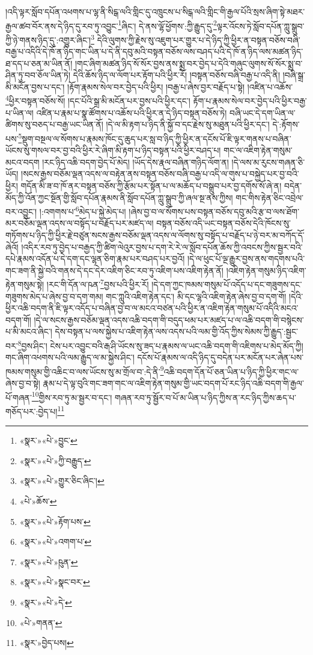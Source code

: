 །འདི་ལྟར་སློབ་དཔོན་འཕགས་པ་ལྷ་ནི་སིངྒ་ལའི་གླིང་དུ་འཁྲུངས་པ་སིངྒ་ལའི་གླིང་གི་རྒྱལ་པོའི་སྲས་ཞིག་སྟེ་མཐར་རྒྱལ་ཚབ་བོར་ནས་དེ་ཉིད་དུ་རབ་ཏུ་འབྱུང་\footnote{«སྣར་»«པེ་»བྱུང་}ཞིང་། དེ་ནས་ལྷོ་ཕྱོགས་:ཀྱི་རྒྱུད་དུ་\footnote{«སྣར་»«པེ་»ཀྱི་བརྒྱུད་}ལྟར་འོངས་ཏེ་སློབ་དཔོན་ཀླུ་སྒྲུབ་ཀྱི་ཉེ་གནས་ཉིད་དུ་:འགྱུར་ཞིང་།\footnote{«སྣར་»«པེ་»གྱུར་ཅིང་ཞིང་།} དེའི་ལུགས་ཀྱི་རྗེས་སུ་འཇུག་པར་གྱུར་པ་དེ་ཉིད་ཀྱི་ཕྱིར་ན་བསྟན་བཅོས་བཞི་བརྒྱ་པ་འདིའི་དེ་ཁོ་ན་ཉིད་གང་ཡིན་པ་དེ་ནི་དབུ་མའི་བསྟན་བཅོས་ལས་བཤད་པའི་དེ་ཁོ་ན་ཉིད་ལས་མཚན་ཉིད་ཐ་དད་པ་ཅན་མ་ཡིན་ནོ། །གང་ཞིག་མཚན་ཉིད་སོ་སོར་བྱས་ནས་སྨྲ་བར་བྱེད་པ་དེའི་གཞུང་ལུགས་སོ་སོར་སྨྲ་བ་ཤིན་ཏུ་བབ་ཅོལ་ཡིན་ཏེ། དེའི་ཆོས་ཉིད་ལ་ལོག་པར་རྟོག་པའི་ཕྱིར་རོ། །བསྟན་བཅོས་བཞི་བརྒྱ་པ་འདི་ནི། །བཞི་སྒྲ་མི་མངོན་བྱས་པ་དང་། །རྟོག་རྣམས་སེལ་བར་བྱེད་པའི་ཕྱིར། །བརྒྱ་པ་ཞེས་བྱར་བརྗོད་པ་སྟེ། །འཛིན་པ་འཆོས་\footnote{«པེ་»ཆོས་}ཕྱིར་བསྟན་བཅོས་སོ། །དང་པོའི་སྒྲ་མི་མངོན་པར་བྱས་པའི་ཕྱིར་དང་། རྟོག་པ་རྣམས་སེལ་བར་བྱེད་པའི་ཕྱིར་བརྒྱ་པ་ཡིན་ལ། འཛིན་པ་རྣམ་པ་སྣ་ཚོགས་པ་འཆོས་པའི་ཕྱིར་ན་དེ་ཉིད་བསྟན་བཅོས་ཏེ། བཞི་ཡང་དེ་དག་ཡིན་ལ་ཚིགས་སུ་བཅད་པ་བརྒྱ་ཡང་ཡིན་ནོ། །དེ་ལ་མི་རྟག་པ་ཉིད་ནི་སྐྱོ་བ་དང་རྗེས་སུ་མཐུན་པའི་ཕྱིར་དང་། དེ་:རྟོགས་པས་\footnote{«སྣར་»«པེ་»རྟོག་པས་}སྡུག་བསྔལ་ལ་སོགས་པ་རྣམས་ཁོང་དུ་ཆུད་པར་སླ་བ་ཉིད་ཀྱི་ཕྱིར་ན་དངོས་པོ་ཇི་ལྟར་གནས་པ་བཞིན་ཡོངས་སུ་གསལ་བར་བྱ་བའི་ཕྱིར་རེ་ཞིག་མི་རྟག་པ་ཉིད་བསྟན་པའི་ཕྱིར་བཤད་པ། གང་ལ་འཇིག་རྟེན་གསུམ་མངའ་བདག །རང་ཉིད་འཆི་བདག་བྱེད་པོ་མེད། །ཡོད་དེས་རྣལ་བཞིན་གཉིད་ལོག་ན། །དེ་ལས་མ་རུངས་གཞན་ཅི་ཡོད། །སངས་རྒྱས་བཅོམ་ལྡན་འདས་ལ་བརྟེན་ནས་བསྟན་བཅོས་བཞི་བརྒྱ་པ་འདི་ལ་གུས་པ་བསྐྱེད་པར་བྱ་བའི་ཕྱིར། གདོན་མི་ཟ་བ་ཁོ་ནར་བསྟན་བཅོས་ཀྱི་རྩོམ་པར་སྟོན་པ་ལ་མཆོད་པ་བསྒྲུབ་པར་བྱ་དགོས་སོ་ཞེ་ན། བདེན་མོད་ཀྱི་འོན་ཀྱང་སྔོན་གྱི་སློབ་དཔོན་རྣམས་ནི་སློབ་དཔོན་ཀླུ་སྒྲུབ་ཀྱི་ཞལ་སྔ་ནས་ཀྱིས། གང་གིས་རྟེན་ཅིང་འབྲེལ་བར་འབྱུང་། །:འགགས་པ་\footnote{«སྣར་»«པེ་»འགག་པ་}མེད་པ་སྐྱེ་མེད་པ། །ཞེས་བྱ་བ་ལ་སོགས་པས་བསྟན་བཅོས་དབུ་མའི་རྩ་བ་ལས་ཐོག་མར་བཅོམ་ལྡན་འདས་ལ་བསྟོད་པ་བརྗོད་པར་མཛད་ལ། བསྟན་བཅོས་འདི་ཡང་བསྟན་བཅོས་དེའི་ཁོངས་སུ་གཏོགས་པ་ཉིད་ཀྱི་ཕྱིར་རྗེ་བཙུན་སངས་རྒྱས་བཅོམ་ལྡན་འདས་ལ་ལོགས་སུ་བསྟོད་པ་བརྗོད་པ་ཉེ་བར་མ་བཀོད་དོ་ཞེའོ། །འདིར་རབ་ཏུ་བྱེད་པ་བརྒྱད་ཀྱི་ཚིག་ལེའུར་བྱས་པ་དག་རེ་རེ་ལ་སློབ་དཔོན་ཆོས་ཀྱི་འབངས་ཀྱིས་སྦྱར་བའི་དཔེ་རྣམས་འདོན་པ་དེ་དག་དང་ལྷན་ཅིག་རྣམ་པར་བཤད་པར་བྱའོ། །དེ་ལ་ཕུང་པོ་ལྔ་རྒྱུར་བྱས་ནས་གདགས་པའི་གང་ཟག་ནི་སྐྱེ་བའི་གནས་དེ་དང་དེར་འཇིག་ཅིང་རབ་ཏུ་འཇིག་པས་འཇིག་རྟེན་ནོ། །འཇིག་རྟེན་གསུམ་ཉིད་འཇིག་རྟེན་གསུམ་སྟེ། །རང་གི་དོན་ལ་ཥན་\footnote{«སྣར་»«པེ་»ཥུན་}བྱས་པའི་ཕྱིར་རོ། །དེ་དག་ཀྱང་ཁམས་གསུམ་པོ་འདོད་པ་དང་གཟུགས་དང་གཟུགས་མེད་པ་ཞེས་བྱ་བ་དག་གམ། གང་ཀླུའི་འཇིག་རྟེན་དང་། མི་དང་ལྷའི་འཇིག་རྟེན་ཞེས་བྱ་བ་དག་གོ། །དེའི་ཕྱིར་འཆི་བདག་ནི་ཇི་ལྟར་འདོད་པ་བཞིན་བྱ་བ་ལ་མངའ་བཙན་པའི་ཕྱིར་ན་འཇིག་རྟེན་གསུམ་པོ་འདིའི་མངའ་བདག་གོ། །དེ་ལ་སངས་རྒྱས་བཅོམ་ལྡན་འདས་འཆི་བདག་གི་བདུད་ཕམ་པར་མཛད་པ་ལ་འཆི་བདག་གི་བསྙེངས་པ་མི་མངའ་ཞིང་། དེས་བསྟན་པ་ལས་སྐྱེས་པ་འཇིག་རྟེན་ལས་འདས་པའི་ལམ་གྱི་འོད་ཀྱིས་སེམས་ཀྱི་རྒྱུད་:སྦྱང་བར་\footnote{«སྣར་»«པེ་»སྣང་བར་}བྱས་ཤིང་། ངེས་པར་འབྱུང་བའི་རྒ་ཤི་ཡོངས་སུ་ཟད་པ་རྣམས་ལ་ཡང་འཆི་བདག་གི་འཇིགས་པ་མེད་མོད་ཀྱི། གང་ཞིག་འཕགས་པའི་ལམ་རྒྱུད་ལ་མ་སྐྱེས་ཤིང་། དངོས་པོ་རྣམས་ལ་འདི་ཉིད་དུ་བདེན་པར་མངོན་པར་ཞེན་པས་ཁམས་གསུམ་གྱི་འཆིང་བ་ལས་ཡོངས་སུ་མ་གྲོལ་བ་:དེ་ནི་\footnote{«སྣར་»«པེ་»དེ་}འཆི་བདག་དོན་པོ་ཅན་ཡིན་པ་ཉིད་ཀྱི་ཕྱིར་གང་ལ་ཞེས་བྱ་བ་སྟེ། རྣམ་པ་དེ་ལྟ་བུའི་གང་ཟག་གང་ལ་འཇིག་རྟེན་གསུམ་གྱི་ཡང་བདག་པོ་རང་ཉིད་འཆི་བདག་གི་རྒྱལ་པོ་གཞན་\footnote{«པེ་»གནན་}གྱིས་རབ་ཏུ་མ་སྦྱར་བ་དང་། གཞན་རབ་ཏུ་སྦྱོར་བ་པོ་མ་ཡིན་པ་ཉིད་ཀྱིས་ན་རང་ཉིད་ཀྱིས་ཆད་པ་གཅོད་པར་:བྱེད་པ།\footnote{«སྣར་»བྱེད་པས།} 